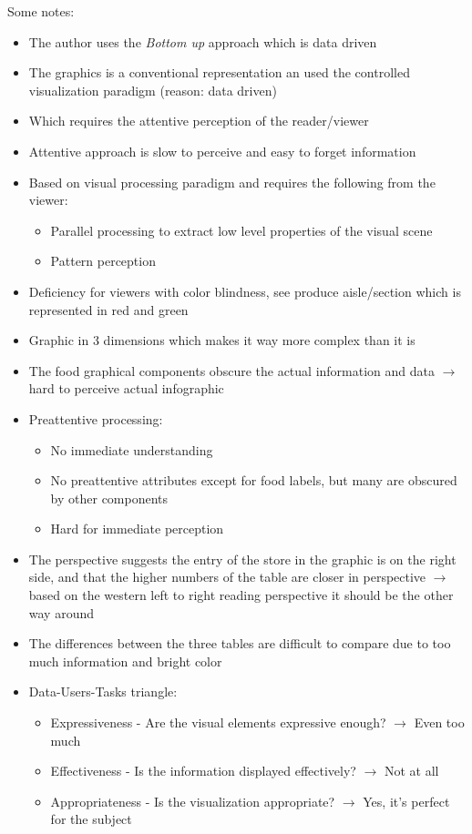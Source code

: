 \documentclass{article}
\begin{document}
Some notes:
\begin{itemize}
    \item The author uses the \textit{Bottom up} approach which is data driven
    \item The graphics is a conventional representation an used the controlled visualization paradigm (reason: data driven)
    \item Which requires the attentive perception of the reader/viewer
    \item Attentive approach is slow to perceive and easy to forget information
    \item Based on visual processing paradigm and requires the following from the viewer:
    \begin{itemize}
        \item Parallel processing to extract low level properties of the visual scene
        \item Pattern perception
    \end{itemize}
    \item Deficiency for viewers with color blindness, see produce aisle/section which is represented in red and green
    \item Graphic in 3 dimensions which makes it way more complex than it is
    \item The food graphical components obscure the actual information and data $\rightarrow$ hard to perceive actual infographic
    \item Preattentive processing:
    \begin{itemize}
        \item No immediate understanding
        \item No preattentive attributes except for food labels, but many are obscured by other components
        \item Hard for immediate perception
    \end{itemize}
    \item The perspective suggests the entry of the store in the graphic is on the right side, and that the higher numbers of the table are closer in perspective $\rightarrow$ based on the western left to right reading perspective it should be the other way around
    \item The differences between the three tables are difficult to compare due to too much information and bright color
    \item Data-Users-Tasks triangle:
    \begin{itemize}
        \item Expressiveness - Are the visual elements expressive enough? $\rightarrow$ Even too much
        \item Effectiveness - Is the information displayed effectively? $\rightarrow$ Not at all
        \item Appropriateness - Is the visualization appropriate? $\rightarrow$ Yes, it's perfect for the subject
    \end{itemize}
\end{itemize}
\end{document}
